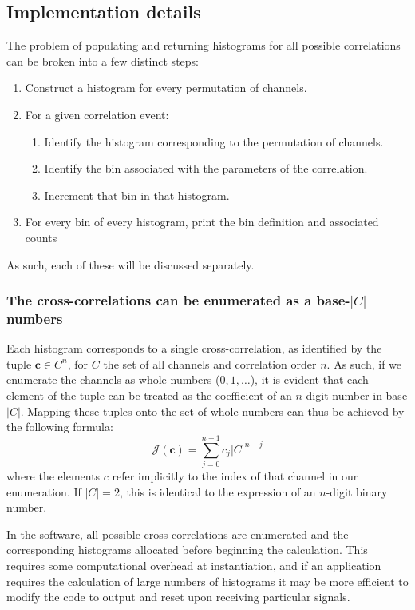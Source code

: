\documentclass{article}
\renewcommand{\vec}{\boldsymbol}
\newcommand{\abs}[1]{\ensuremath{\left|#1\right|}}
\newcommand{\channel}{\ensuremath{c}}
\newcommand{\channels}{\ensuremath{C}}
\newcommand{\Index}{\ensuremath{\mathcal{J}}}
\begin{document}
\subsection{Implementation details}
The problem of populating and returning histograms for all possible correlations can be broken into a few distinct steps:
\begin{enumerate}
\item Construct a histogram for every permutation of channels.
\item For a given correlation event:
  \begin{enumerate}
  \item Identify the histogram corresponding to the permutation of channels.
  \item Identify the bin associated with the parameters of the correlation.
  \item Increment that bin in that histogram.
  \end{enumerate}
\item For every bin of every histogram, print the bin definition and associated counts
\end{enumerate}
As such, each of these will be discussed separately.

\subsubsection{The cross-correlations can be enumerated as a base-$\abs{\channels}$ numbers}
Each histogram corresponds to a single cross-correlation, as identified by the tuple $\vec{\channel}\in\channels^{n}$, for $\channels$ the set of all channels and correlation order $n$. As such, if we enumerate the channels as whole numbers ($0, 1, \ldots$), it is evident that each element of the tuple can be treated as the coefficient of an $n$-digit number in base $\abs{\channels}$. Mapping these tuples onto the set of whole numbers can thus be achieved by the following formula:
\begin{equation}
\Index(\vec{\channel}) = \sum_{j=0}^{n-1}{\channel_{j}\abs{\channels}^{n-j}}
\end{equation}
where the elements $\channel$ refer implicitly to the index of that channel in our enumeration.
If $\abs{\channels}=2$, this is identical to the expression of an $n$-digit binary number.

In the software, all possible cross-correlations are enumerated and the corresponding histograms allocated before beginning the calculation. This requires some computational overhead at instantiation, and if an application requires the calculation of large numbers of histograms it may be more efficient to modify the code to output and reset upon receiving particular signals.
\end{document}

